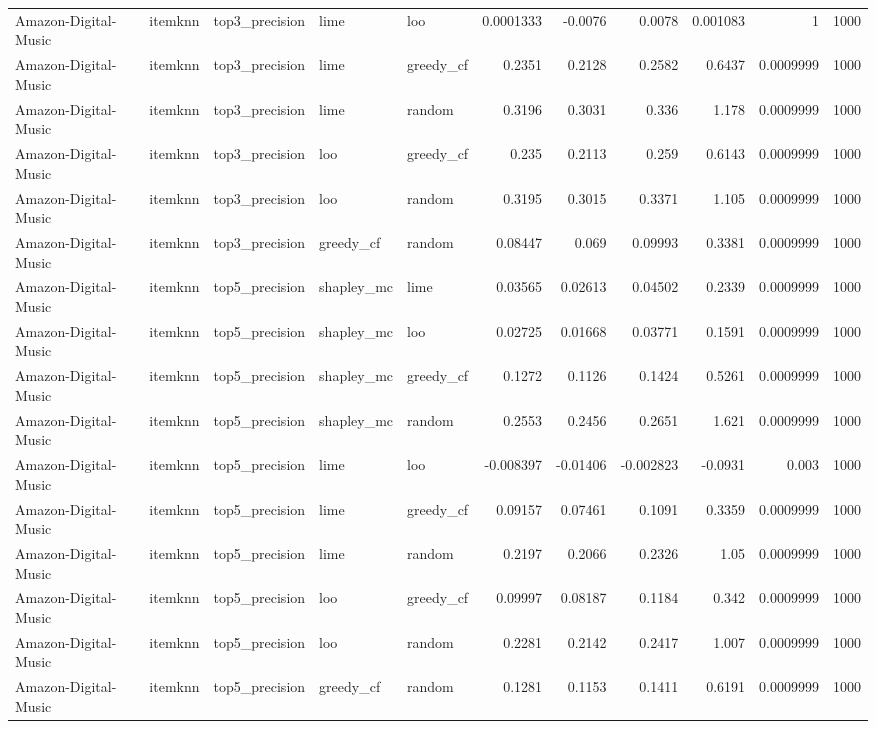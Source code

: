 \begin{table}[t]
\begin{tabular}{lllllrrrrrr}
Amazon-Digital-Music & itemknn & top3\_precision & lime & loo & 0.0001333 & -0.0076 & 0.0078 & 0.001083 & 1 & 1000 \\
Amazon-Digital-Music & itemknn & top3\_precision & lime & greedy\_cf & 0.2351 & 0.2128 & 0.2582 & 0.6437 & 0.0009999 & 1000 \\
Amazon-Digital-Music & itemknn & top3\_precision & lime & random & 0.3196 & 0.3031 & 0.336 & 1.178 & 0.0009999 & 1000 \\
Amazon-Digital-Music & itemknn & top3\_precision & loo & greedy\_cf & 0.235 & 0.2113 & 0.259 & 0.6143 & 0.0009999 & 1000 \\
Amazon-Digital-Music & itemknn & top3\_precision & loo & random & 0.3195 & 0.3015 & 0.3371 & 1.105 & 0.0009999 & 1000 \\
Amazon-Digital-Music & itemknn & top3\_precision & greedy\_cf & random & 0.08447 & 0.069 & 0.09993 & 0.3381 & 0.0009999 & 1000 \\
Amazon-Digital-Music & itemknn & top5\_precision & shapley\_mc & lime & 0.03565 & 0.02613 & 0.04502 & 0.2339 & 0.0009999 & 1000 \\
Amazon-Digital-Music & itemknn & top5\_precision & shapley\_mc & loo & 0.02725 & 0.01668 & 0.03771 & 0.1591 & 0.0009999 & 1000 \\
Amazon-Digital-Music & itemknn & top5\_precision & shapley\_mc & greedy\_cf & 0.1272 & 0.1126 & 0.1424 & 0.5261 & 0.0009999 & 1000 \\
Amazon-Digital-Music & itemknn & top5\_precision & shapley\_mc & random & 0.2553 & 0.2456 & 0.2651 & 1.621 & 0.0009999 & 1000 \\
Amazon-Digital-Music & itemknn & top5\_precision & lime & loo & -0.008397 & -0.01406 & -0.002823 & -0.0931 & 0.003 & 1000 \\
Amazon-Digital-Music & itemknn & top5\_precision & lime & greedy\_cf & 0.09157 & 0.07461 & 0.1091 & 0.3359 & 0.0009999 & 1000 \\
Amazon-Digital-Music & itemknn & top5\_precision & lime & random & 0.2197 & 0.2066 & 0.2326 & 1.05 & 0.0009999 & 1000 \\
Amazon-Digital-Music & itemknn & top5\_precision & loo & greedy\_cf & 0.09997 & 0.08187 & 0.1184 & 0.342 & 0.0009999 & 1000 \\
Amazon-Digital-Music & itemknn & top5\_precision & loo & random & 0.2281 & 0.2142 & 0.2417 & 1.007 & 0.0009999 & 1000 \\
Amazon-Digital-Music & itemknn & top5\_precision & greedy\_cf & random & 0.1281 & 0.1153 & 0.1411 & 0.6191 & 0.0009999 & 1000 \\

\end{tabular}
\end{table}

